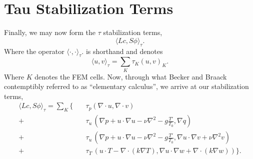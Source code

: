 %
%
\section{Tau Stabilization Terms}

Finally, we may now form the $\tau$ stabilization terms, 
\begin{equation}
 \langle Lc,S\phi \rangle_\tau. 
\end{equation}
Where the operator $ \langle \cdot,\cdot \rangle_\tau. $ is shorthand 
and denotes
\begin{equation}
 \langle u,v \rangle_\tau = \sum_K \tau_K (u,v)_K.
\end{equation}
Where $K$ denotes the FEM cells. Now, through what Becker and Braack
contemptibly referred to as ``elementary calculus'', we arrive at our
stabilization terms,  
\begin{align*}
 \langle Lc,S\phi \rangle_\tau = \sum_K \{ \quad &\tau_p (\nabla \cdot u,
 \nabla \cdot v) \\
 +\quad &\tau_u \,(\nabla p + u \cdot \nabla u - \nu \nabla^2 - g \frac{T'}{T_0},
 \nabla q) \\
 +\quad &\tau_u \, (\nabla p + u \cdot \nabla u - \nu \nabla^2 - g \frac{T'}{T_0},
 \nabla u \cdot \nabla v + \nu \nabla^2 v) \\
 +\quad &\tau_T \, (u \cdot T - \nabla \cdot (k \nabla T), \nabla u \cdot \nabla
 w + \nabla \cdot (k \nabla w)) \}.
\end{align*}

